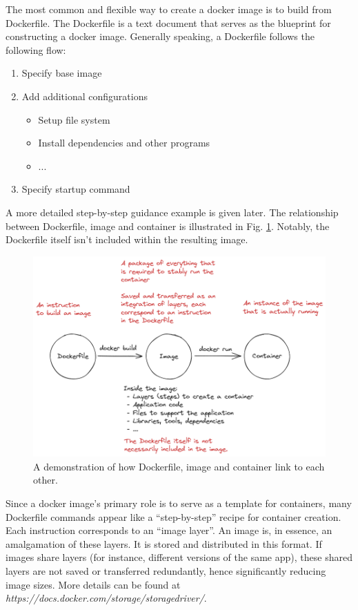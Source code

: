 The most common and flexible way to create a docker image is to build from Dockerfile. The Dockerfile is a text document that serves as the blueprint for constructing a docker image. Generally speaking, a Dockerfile follows the following flow:
\begin{enumerate}[(1)]
	\item Specify base image
	\item Add additional configurations
	\begin{itemize}
		\item Setup file system
		\item Install dependencies and other programs
		\item ...
	\end{itemize}
	\item Specify startup command
\end{enumerate}
A more detailed step-by-step guidance example is given later. The relationship between Dockerfile, image and container is illustrated in Fig. \ref{ch:vac:fig:dockerfiletoimage}. Notably, the Dockerfile itself isn't included within the resulting image.

\begin{figure}[!htb]
	\centering
	\includegraphics[width=350pt]{chapters/part-3/figures/dockerfiletoimage.png}
	\caption{A demonstration of how Dockerfile, image and container link to each other.} \label{ch:vac:fig:dockerfiletoimage}
\end{figure}

Since a docker image's primary role is to serve as a template for containers, many Dockerfile commands appear like a ``step-by-step'' recipe for container creation. Each instruction corresponds to an ``image layer''. An image is, in essence, an amalgamation of these layers. It is stored and distributed in this format. If images share layers (for instance, different versions of the same app), these shared layers are not saved or transferred redundantly, hence significantly reducing image sizes. More details can be found at \textit{https://docs.docker.com/storage/storagedriver/}.


